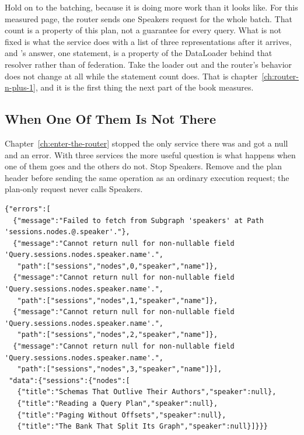 %
Hold on to the batching, because it is doing more work than it looks like.
For this measured page, the router sends one Speakers request for the whole
batch. That count is a property of this plan, not a guarantee for every query. What is not fixed is what the
service does with a list of three representations after it arrives, and
's answer, one statement, is a property of the DataLoader
behind that resolver rather than of federation. Take the loader out and the
router's behavior does not change at all while the statement count does.
That is chapter~\ref{ch:router-n-plus-1}, and it is the first thing the next
part of the book measures.

\subsection{When One Of Them Is Not There}

%
Chapter~\ref{ch:enter-the-router} stopped the only service there was and got a
null and an error. With three services the more useful question is what happens
when one of them goes and the others do not. Stop Speakers. Remove
 and the plan header before sending the same operation
as an ordinary execution request; the plan-only request never calls Speakers.

\begin{verbatim}
{"errors":[
  {"message":"Failed to fetch from Subgraph 'speakers' at Path 'sessions.nodes.@.speaker'."},
  {"message":"Cannot return null for non-nullable field 'Query.sessions.nodes.speaker.name'.",
   "path":["sessions","nodes",0,"speaker","name"]},
  {"message":"Cannot return null for non-nullable field 'Query.sessions.nodes.speaker.name'.",
   "path":["sessions","nodes",1,"speaker","name"]},
  {"message":"Cannot return null for non-nullable field 'Query.sessions.nodes.speaker.name'.",
   "path":["sessions","nodes",2,"speaker","name"]},
  {"message":"Cannot return null for non-nullable field 'Query.sessions.nodes.speaker.name'.",
   "path":["sessions","nodes",3,"speaker","name"]}],
 "data":{"sessions":{"nodes":[
   {"title":"Schemas That Outlive Their Authors","speaker":null},
   {"title":"Reading a Query Plan","speaker":null},
   {"title":"Paging Without Offsets","speaker":null},
   {"title":"The Bank That Split Its Graph","speaker":null}]}}}
\end{verbatim}

